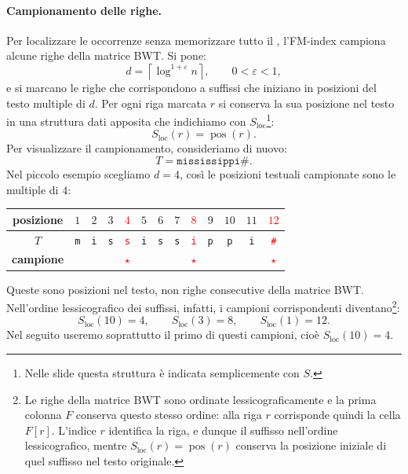 \documentclass{article}
\theoremstyle{definition}
\numberwithin{equation}{section}
\begin{document}
\paragraph{Campionamento delle righe.}
Per localizzare le occorrenze senza memorizzare tutto il , l'FM-index campiona alcune righe della matrice BWT. Si pone:
\[
    d
    =
    \left\lceil \log^{1+\varepsilon} n\right\rceil,
    \qquad
    0<\varepsilon<1,
\]
e si marcano le righe che corrispondono a suffissi che iniziano in posizioni del testo multiple di $d$. Per ogni riga marcata $r$ si conserva la sua posizione nel testo in una struttura dati apposita che indichiamo con $S_{\operatorname{loc}}$\footnote{Nelle slide questa struttura è indicata semplicemente con $S$.}:
\[
    S_{\operatorname{loc}}(r)=\operatorname{pos}(r).
\]
Per visualizzare il campionamento, consideriamo di nuovo:
\[
    T=\texttt{mississippi\#}.
\]
Nel piccolo esempio scegliamo $d=4$, così le posizioni testuali campionate sono le multiple di $4$:
\begin{center}
    \small
    \setlength{\tabcolsep}{4pt}
    \begin{tabular}{c|cccccccccccc}
        \textbf{posizione} &
        $1$                & $2$        & $3$        & \textcolor{red}{$4$}         &
        $5$                & $6$        & $7$        & \textcolor{red}{$8$}         &
        $9$                & $10$       & $11$       & \textcolor{red}{$12$}          \\
        \hline
        $T$                &
        \texttt{m}         & \texttt{i} & \texttt{s} & \textcolor{red}{\texttt{s}}  &
        \texttt{i}         & \texttt{s} & \texttt{s} & \textcolor{red}{\texttt{i}}  &
        \texttt{p}         & \texttt{p} & \texttt{i} & \textcolor{red}{\texttt{\#}}   \\
        \textbf{campione}  &
                           &            &            & \textcolor{red}{$\star$}     &
                           &            &            & \textcolor{red}{$\star$}     &
                           &            &            & \textcolor{red}{$\star$}
    \end{tabular}
\end{center}
Queste sono posizioni nel testo, non righe consecutive della matrice BWT. Nell'ordine lessicografico dei suffissi, infatti, i campioni corrispondenti diventano\footnote{Le righe della matrice BWT sono ordinate lessicograficamente e la prima colonna $F$ conserva questo stesso ordine: alla riga $r$ corrisponde quindi la cella $F[r]$. L'indice $r$ identifica la riga, e dunque il suffisso nell'ordine lessicografico, mentre $S_{\operatorname{loc}}(r)=\operatorname{pos}(r)$ conserva la posizione iniziale di quel suffisso nel testo originale.}:
\[
    S_{\operatorname{loc}}(10)=4,
    \qquad
    S_{\operatorname{loc}}(3)=8,
    \qquad
    S_{\operatorname{loc}}(1)=12.
\]
Nel seguito useremo soprattutto il primo di questi campioni, cioè $S_{\operatorname{loc}}(10)=4$.
\end{document}
